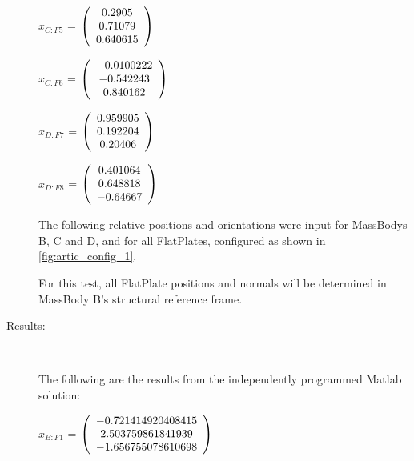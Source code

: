 \begin{description}
$\hat{x}_{C:F5}$ = $\left( \begin{array} {ccc}     0.2905 \\    0.71079 \\   0.640615 
\end{array} \right)\\ \\$

$\hat{x}_{C:F6}$ = $\left( \begin{array} {ccc} -0.0100222 \\  -0.542243 \\   0.840162 
\end{array} \right)\\ \\$

$\hat{x}_{D:F7}$ = $\left( \begin{array} {ccc}   0.959905 \\   0.192204 \\    0.20406 
\end{array} \right)\\ \\$

$\hat{x}_{D:F8}$ = $\left( \begin{array} {ccc}   0.401064 \\   0.648818 \\   -0.64667 
\end{array} \right)\\ \\$

The following relative positions and orientations were input for MassBodys
B, C and D, and for all FlatPlates, configured as shown in
\ref{fig:artic_config_1}.

For this test, all FlatPlate positions and normals will be determined in
MassBody B's structural reference frame.

\item[Results:] \ \newline

The following are the results from the independently programmed Matlab solution:

$x_{B:F1}$  = $\left( \begin{array} {ccc} -0.721414920408415 \\ 2.503759861841939 \\ -1.656755078610698
\end{array} \right)\\ \\$


\end{description}
